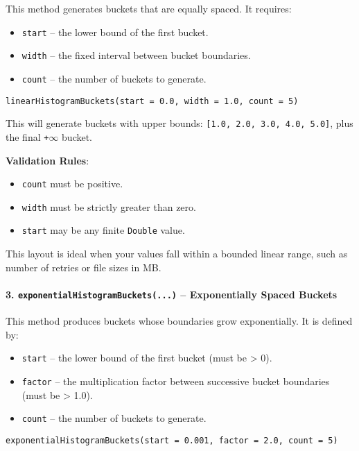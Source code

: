 This method generates buckets that are equally spaced. It requires:

\begin{itemize}
    \item \texttt{start} – the lower bound of the first bucket.
    \item \texttt{width} – the fixed interval between bucket boundaries.
    \item \texttt{count} – the number of buckets to generate.
\end{itemize}

\begin{verbatim}
linearHistogramBuckets(start = 0.0, width = 1.0, count = 5)
\end{verbatim}

This will generate buckets with upper bounds: \texttt{[1.0, 2.0, 3.0, 4.0, 5.0]}, plus the final \texttt{+\(\infty\)} bucket.

\textbf{Validation Rules}:
\begin{itemize}
    \item \texttt{count} must be positive.
    \item \texttt{width} must be strictly greater than zero.
    \item \texttt{start} may be any finite \texttt{Double} value.
\end{itemize}

This layout is ideal when your values fall within a bounded linear range, such as number of retries or file sizes in MB.

\paragraph{3. \texttt{exponentialHistogramBuckets(...)} – Exponentially Spaced Buckets}

This method produces buckets whose boundaries grow exponentially. It is defined by:

\begin{itemize}
    \item \texttt{start} – the lower bound of the first bucket (must be > 0).
    \item \texttt{factor} – the multiplication factor between successive bucket boundaries (must be > 1.0).
    \item \texttt{count} – the number of buckets to generate.
\end{itemize}

\begin{verbatim}
exponentialHistogramBuckets(start = 0.001, factor = 2.0, count = 5)
\end{verbatim}


